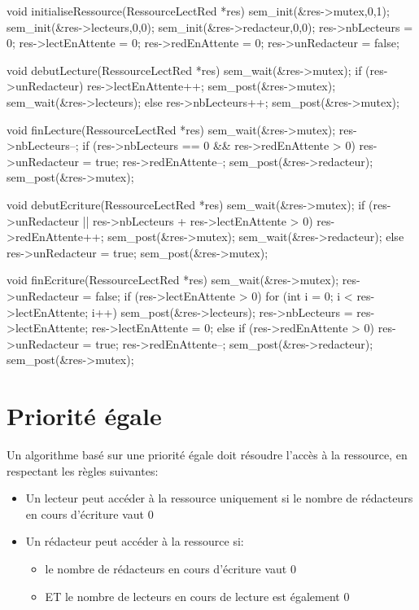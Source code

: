 \begin{codeblock}[title={Lecteurs-rédacteurs: priorité aux lecteurs, solution générale},label=lectred:prioritelecteurgenerale]
void initialiseRessource(RessourceLectRed *res) {
    sem_init(&res->mutex,0,1);
    sem_init(&res->lecteurs,0,0);
    sem_init(&res->redacteur,0,0);
    res->nbLecteurs = 0;
    res->lectEnAttente = 0;
    res->redEnAttente = 0;
    res->unRedacteur = false;
  }

void debutLecture(RessourceLectRed *res) {
    sem_wait(&res->mutex);
    if (res->unRedacteur) {
        res->lectEnAttente++;
        sem_post(&res->mutex);
        sem_wait(&res->lecteurs);
      }
    else {
        res->nbLecteurs++;
        sem_post(&res->mutex);
      }
  }

void finLecture(RessourceLectRed *res) {
    sem_wait(&res->mutex);
    res->nbLecteurs--;
    if (res->nbLecteurs == 0 && res->redEnAttente > 0) {
        res->unRedacteur = true;
        res->redEnAttente--;
        sem_post(&res->redacteur);
      }
    sem_post(&res->mutex);
  }

void debutEcriture(RessourceLectRed *res) {
    sem_wait(&res->mutex);
    if (res->unRedacteur || res->nbLecteurs + res->lectEnAttente > 0) {
        res->redEnAttente++;
        sem_post(&res->mutex);
        sem_wait(&res->redacteur);
      }
    else {
        res->unRedacteur = true;
        sem_post(&res->mutex);
      }
  }

void finEcriture(RessourceLectRed *res) {
    sem_wait(&res->mutex);
    res->unRedacteur = false;
    if (res->lectEnAttente > 0) {
        for (int i = 0; i < res->lectEnAttente; i++)
        sem_post(&res->lecteurs);
        res->nbLecteurs = res->lectEnAttente;
        res->lectEnAttente = 0;
      }
    else if (res->redEnAttente > 0) {
        res->unRedacteur = true;
        res->redEnAttente--;
        sem_post(&res->redacteur);
      }
    sem_post(&res->mutex);
  }
\end{codeblock}


\section{Priorité égale}
Un algorithme basé sur une priorité égale doit résoudre l'accès à la ressource, en respectant les règles suivantes:
\begin{itemize}
  \item Un lecteur peut accéder à la ressource uniquement si le nombre de rédacteurs en cours d'écriture vaut 0
  \item Un rédacteur peut accéder à la ressource si:
        \begin{itemize}
          \item le nombre de rédacteurs en cours d'écriture vaut 0
          \item ET le nombre de lecteurs en cours de lecture est également 0
        \end{itemize}
\end{itemize}

